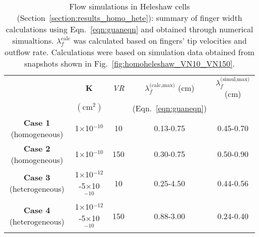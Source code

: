 \begin{landscape}
\begin{table}
  \begin{tabular}{c | c c c c}
    \hline\hline
                                  & {\bf K}                                  & {\it VR}  & $\lambda_{f}^{\text{(calc,max)}}$ (cm) & $\lambda_{f}^{\text{(simul,max)}}$ (cm) \\
                                  & $\left(\text{cm}^{2}\right)$              &           &  (Eqn.~\ref{eqn:guaneqn})  &                    \\
    \hline\hline
    {\bf Case 1} (homogeneous)    &  1$\times$10$^{-10}$                      &    10      &  0.13-0.75                 &   0.45-0.70       \\
    {\bf Case 2} (homogeneous)    &  1$\times$10$^{-10}$                      &    150     &  0.30-0.75                 &   0.50-0.90       \\
    {\bf Case 3} (heterogeneous)  &  1$\times$10$^{-12}$-5$\times$10$^{-10}$   &    10      &  0.25-4.50                 &   0.44-0.56       \\
    {\bf Case 4} (heterogeneous)  &  1$\times$10$^{-12}$-5$\times$10$^{-10}$   &    150     &  0.88-3.00                 &   0.24-0.40       
  \end{tabular}
   \caption{Flow simulations in Heleshaw cells (Section~\ref{section:results_homo_hete}): summary of finger width calculations using Eqn.~\ref{eqn:guaneqn} and obtained through numerical simualtions. $\lambda_{f}^{\text{calc}}$ was calculated based on fingers' tip velocities and outflow rate. Calculations were based on simulation data obtained from snapshots shown in Fig.~\ref{fig:homoheleshaw_VN10_VN150}.}\label{table:Heleshaw}
\end{table}
\end{landscape}
\clearpage








